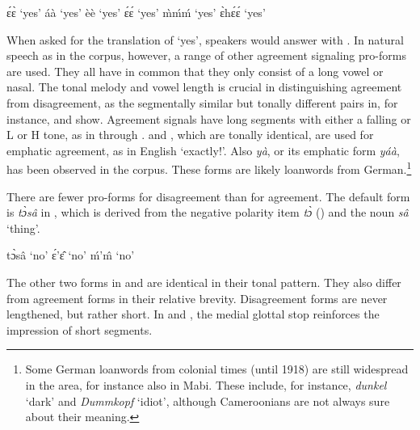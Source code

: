 \ea \label{yes}
  \ea \label{yes1} ɛ́ɛ̀ `yes'
\ex\label{yes2} áà `yes' 
\ex\label{yes3} èè `yes' 
\ex\label{yes4} ɛ́ɛ́ `yes' 
\ex\label{yes5} m̀ḿḿ `yes'
\ex\label{yes6} ɛ̀hɛ́ɛ́  `yes'
\z
\z

When asked for the translation of `yes', speakers would answer with . In natural speech as in the corpus, however, a range of other agreement signaling pro-forms are used. They all have in common that they only consist of a long vowel or nasal. The tonal melody and vowel length is crucial in distinguishing agreement from disagreement, as the segmentally similar but tonally different pairs in, for instance,  and  show. Agreement signals have long segments with either a  falling  or L or H tone, as in   through .  and , which are tonally identical, are used for emphatic agreement, as in English `exactly!'.
Also {\itshape yà}, or its emphatic form {\itshape yáà}, has been observed in the corpus. These forms are likely loanwords from German.\footnote{Some German loanwords from colonial times (until 1918) are still widespread in the area, for instance also in Mabi. These include, for instance, {\itshape dunkel} `dark' and {\itshape Dummkopf} `idiot', although Cameroonians are not always sure about their meaning.}

There are fewer pro-forms for disagreement than for agreement. The default form is {\itshape tɔ̀sâ} in , which is derived from the negative polarity item {\itshape tɔ̀} () and the noun {\itshape sâ} `thing'.

\ea \label{no}
  \ea \label{no1} tɔ̀sâ `no'
\ex\label{no2} ɛ́'ɛ̂ `no'
\ex\label{no3} ḿ'm̂ `no'
\z
\z

The other two forms in  and  are identical in their tonal pattern. They also differ from agreement forms in their relative brevity. Disagreement forms are never lengthened, but rather short. In  and , the medial glottal stop reinforces the impression of short segments.












